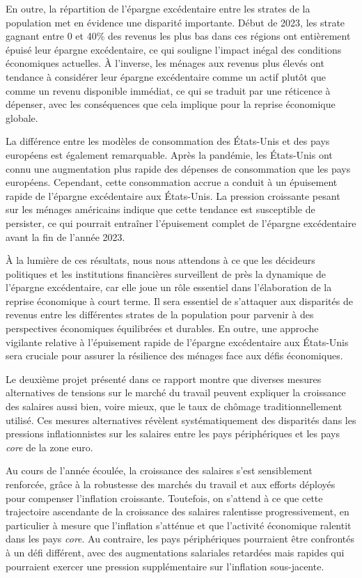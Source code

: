 En outre, la répartition de l'épargne excédentaire entre les strates de la population met en évidence une disparité importante. 
Début de 2023, les strate gagnant entre 0 et 40\% des revenus les plus bas dans ces régions ont entièrement épuisé leur épargne excédentaire, ce qui souligne l'impact inégal des conditions économiques actuelles. 
À l'inverse, les ménages aux revenus plus élevés ont tendance à considérer leur épargne excédentaire comme un actif plutôt que comme un revenu disponible immédiat, ce qui se traduit par une réticence à dépenser, avec les conséquences que cela implique pour la reprise économique globale.

La différence entre les modèles de consommation des États-Unis et des pays européens est également remarquable. 
Après la pandémie, les États-Unis ont connu une augmentation plus rapide des dépenses de consommation que les pays européens. 
Cependant, cette consommation accrue a conduit à un épuisement rapide de l'épargne excédentaire aux États-Unis. 
La pression croissante pesant sur les ménages américains indique que cette tendance est susceptible de persister, ce qui pourrait entraîner l'épuisement complet de l'épargne excédentaire avant la fin de l'année 2023.

À la lumière de ces résultats, nous nous attendons à ce que les décideurs politiques et les institutions financières surveillent de près la dynamique de l'épargne excédentaire, car elle joue un rôle essentiel dans l'élaboration de la reprise économique à court terme. 
Il sera essentiel de s'attaquer aux disparités de revenus entre les différentes strates de la population pour parvenir à des perspectives économiques équilibrées et durables. 
En outre, une approche vigilante relative à l'épuisement rapide de l'épargne excédentaire aux États-Unis sera cruciale pour assurer la résilience des ménages face aux défis économiques.

Le deuxième projet présenté dans ce rapport montre que diverses mesures alternatives de tensions sur le marché du travail peuvent expliquer la croissance des salaires aussi bien, voire mieux, que le taux de chômage traditionnellement utilisé. 
Ces mesures alternatives révèlent systématiquement des disparités dans les pressions inflationnistes sur les salaires entre les pays périphériques et les pays \textit{core} de la zone euro.

Au cours de l'année écoulée, la croissance des salaires s'est sensiblement renforcée, grâce à la robustesse des marchés du travail et aux efforts déployés pour compenser l'inflation croissante. 
Toutefois, on s'attend à ce que cette trajectoire ascendante de la croissance des salaires ralentisse progressivement, en particulier à mesure que l'inflation s'atténue et que l'activité économique ralentit dans les pays \textit{core}. 
Au contraire, les pays périphériques pourraient être confrontés à un défi différent, avec des augmentations salariales retardées mais rapides qui pourraient exercer une pression supplémentaire sur l'inflation sous-jacente.

